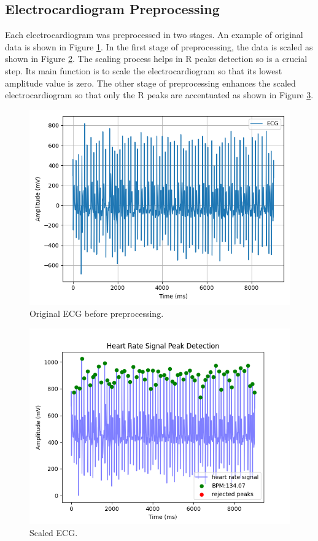 \documentclass[12pt, a4paper]{article}
\newcommand{\en}{\selectlanguage{english}}
\begin{document}
\subsection{Electrocardiogram Preprocessing}
Each electrocardiogram was preprocessed in two stages. An example of original data is shown in Figure \hyperref[original_ECG]{1}. In the first stage of preprocessing, the data is scaled as shown in Figure \hyperref[Scaled_ECG]{2}. The scaling process helps in R peaks detection so is a crucial step. Its main function is to scale the electrocardiogram so that its lowest amplitude value is zero. The other stage of preprocessing enhances the scaled electrocardiogram so that only the R peaks are accentuated as shown in Figure \hyperref[Enchanced_ECG]{3}.

\begin{figure}[H]
	\centering
	\includegraphics[width=1.0\textwidth, height=0.40\textheight]{Raw_ECG.png}
	\caption{\en Original ECG before preprocessing.}
	\label{original_ECG}
\end{figure}

\begin{figure}[H]
	\centering
	\includegraphics[width=1.0\textwidth, height=0.40\textheight]{Scaled_ECG.png}
	\caption{\en Scaled ECG.}
	\label{Scaled_ECG}
\end{figure}
\end{document}
